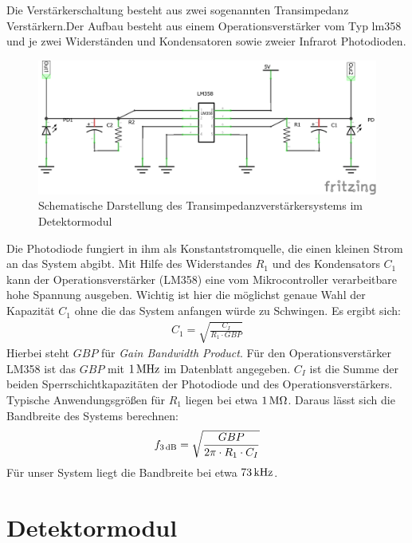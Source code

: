 Die Verstärkerschaltung besteht aus zwei sogenannten Transimpedanz Verstärkern.Der Aufbau besteht aus einem Operationsverstärker vom Typ lm358 und je zwei Widerständen und Kondensatoren sowie zweier Infrarot Photodioden.  
\begin{figure}[h]
	\centering
	\includegraphics[scale=0.5]{../figures/Transimpedanz.png}
	\caption{Schematische Darstellung des Transimpedanzverstärkersystems im Detektormodul}
	\label{fig:Transimpedanz}
\end{figure}
Die Photodiode fungiert in ihm als Konstantstromquelle, die einen kleinen Strom an das System abgibt. Mit Hilfe des Widerstandes $R_1$ und des Kondensators $C_1$ kann der Operationsverstärker (LM358) eine vom Mikrocontroller verarbeitbare hohe Spannung ausgeben. Wichtig ist hier die möglichst genaue Wahl der Kapazität $C_1$ ohne die das System anfangen würde zu Schwingen. Es ergibt sich:
\begin{align*}
	C_1 = \sqrt{\frac{C_I}{R_1 \cdot GBP}}
\end{align*}
Hierbei steht $GBP$ für \textit{Gain Bandwidth Product}. Für den Operationsverstärker LM358 ist das $GBP$ mit $\unit[1]{MHz}$ im Datenblatt angegeben. $C_I$ ist die Summe der beiden Sperrschichtkapazitäten der Photodiode und des Operationsverstärkers. Typische Anwendungsgrößen für $R_1$ liegen bei etwa $\unit[1]{M\Omega}$. Daraus lässt sich die Bandbreite des Systems berechnen:
\begin{align*}
	f_{\unit[3]{dB}} = \sqrt{\frac{GBP}{2\pi \cdot R_1 \cdot C_I}}
\end{align*}
Für unser System liegt die Bandbreite bei etwa $\unit[73]{kHz}$. 




\section{Detektormodul}
\label{sec:Detektormodul}

